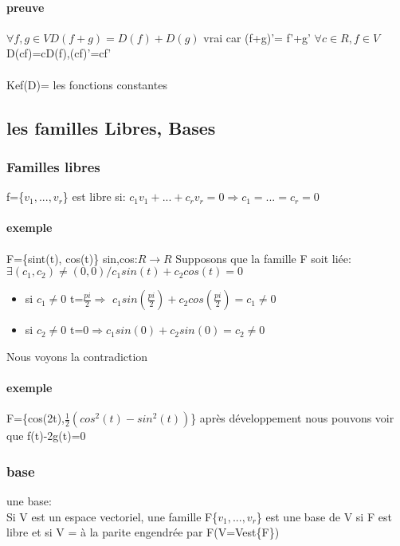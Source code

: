 \documentclass[a4paper,10pt]{article}
\begin{document}
\paragraph{preuve}
$\forall f,g\in V D(f+g)=D(f)+D(g)$ vrai car (f+g)'= f'+g'
\newline
$\forall c\in R,f\in V$ D(cf)=cD(f),(cf)'=cf'
\paragraph{}
Kef(D)= les fonctions constantes
\subsection{les familles Libres, Bases}
\subsubsection{Familles libres}
f=\{$v_1,...,v_r$\} est libre si:
\newline
$c_1v_1+...+c_rv_r=0\Rightarrow c_1=...=c_r=0$
\paragraph{exemple}
F=\{sint(t), cos(t)\} sin,cos:$R\rightarrow R$
\newline
Supposons que la famille F soit liée:
\newline
$\exists (c_1,c_2)\neq (0,0)/c_1sin(t)+c_2cos(t)=0$
\begin{itemize}
 \item si $c_1\neq0$ t=$\frac{pi}{2}\Rightarrow$ $c_1sin(\frac{pi}{2})+c_2cos(\frac{pi}{2})=c_1\neq0$
 \item si $c_2\neq0$ t=0$\Rightarrow c_1sin(0)+c_2sin(0)=c_2\neq 0$
\end{itemize}
Nous voyons la contradiction
\paragraph{exemple}
F=\{cos(2t),$\frac{1}{2}(cos^2(t)-sin^2(t))$\}
\newline
après développement nous pouvons voir que f(t)-2g(t)=0
\subsubsection{base}
\begin{description}
 \item une base:\\{Si V est un espace vectoriel, une famille F\{$v_1,...,v_r$\} est une base de V si F est libre et si V = à la parite engendrée par F(V=Vest\{F\})}
\end{description}
\end{document}
